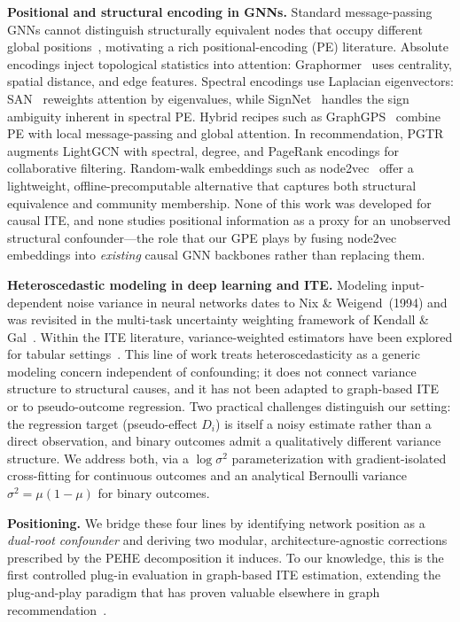 \documentclass[sigconf,anonymous,review]{acmart}
\begin{document}
\textbf{Positional and structural encoding in GNNs.}
Standard message-passing GNNs cannot distinguish structurally equivalent nodes that occupy different global positions~\cite{velickovic2017graph}, motivating a rich positional-encoding (PE) literature. Absolute encodings inject topological statistics into attention: Graphormer~\cite{ying2021graphormer} uses centrality, spatial distance, and edge features. Spectral encodings use Laplacian eigenvectors: SAN~\cite{kreuzer2021san} reweights attention by eigenvalues, while SignNet~\cite{lim2023signnet} handles the sign ambiguity inherent in spectral PE. Hybrid recipes such as GraphGPS~\cite{rampasek2022graphgps} combine PE with local message-passing and global attention. In recommendation, PGTR~\cite{chen2025pgtr} augments LightGCN with spectral, degree, and PageRank encodings for collaborative filtering. Random-walk embeddings such as node2vec~\cite{grover2016node2vec} offer a lightweight, offline-precomputable alternative that captures both structural equivalence and community membership. None of this work was developed for causal ITE, and none studies positional information as a proxy for an unobserved structural confounder---the role that our GPE plays by fusing node2vec embeddings into \emph{existing} causal GNN backbones rather than replacing them.

\textbf{Heteroscedastic modeling in deep learning and ITE.}
Modeling input-dependent noise variance in neural networks dates to Nix \& Weigend~(1994) and was revisited in the multi-task uncertainty weighting framework of Kendall \& Gal~\cite{kendall2018multi}. Within the ITE literature, variance-weighted estimators have been explored for tabular settings~\cite{SHI2024111679, mo2022efficient, abrevaya2023estimation}. This line of work treats heteroscedasticity as a generic modeling concern independent of confounding; it does not connect variance structure to structural causes, and it has not been adapted to graph-based ITE or to pseudo-outcome regression. Two practical challenges distinguish our setting: the regression target (pseudo-effect $D_i$) is itself a noisy estimate rather than a direct observation, and binary outcomes admit a qualitatively different variance structure. We address both, via a $\log\sigma^2$ parameterization with gradient-isolated cross-fitting for continuous outcomes and an analytical Bernoulli variance $\sigma^2 = \mu(1-\mu)$ for binary outcomes.

\textbf{Positioning.} We bridge these four lines by identifying network position as a \emph{dual-root confounder} and deriving two modular, architecture-agnostic corrections prescribed by the PEHE decomposition it induces. To our knowledge, this is the first controlled plug-in evaluation in graph-based ITE estimation, extending the plug-and-play paradigm that has proven valuable elsewhere in graph recommendation~\cite{zheng2025lighterx}.
\end{document}
